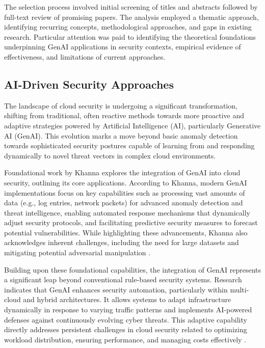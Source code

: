 The selection process involved initial screening of titles and abstracts followed by full-text review of promising papers. The analysis employed a thematic approach, identifying recurring concepts, methodological approaches, and gaps in existing research. Particular attention was paid to identifying the theoretical foundations underpinning GenAI applications in security contexts, empirical evidence of effectiveness, and limitations of current approaches.


\subsection{AI-Driven Security Approaches} %
\label{sec:AI-Driven Security Approaches}

The landscape of cloud security is undergoing a significant transformation, shifting from traditional, often reactive methods towards more proactive and adaptive strategies powered by Artificial Intelligence (AI), particularly Generative AI (GenAI). This evolution marks a move beyond basic anomaly detection towards sophisticated security postures capable of learning from and responding dynamically to novel threat vectors in complex cloud environments.

Foundational work by Khanna \cite{khanna_enhancing_2024} explores the integration of GenAI into cloud security, outlining its core applications. According to Khanna, modern GenAI implementations focus on key capabilities such as processing vast amounts of data (e.g., log entries, network packets) for advanced anomaly detection and threat intelligence, enabling automated response mechanisms that dynamically adjust security protocols, and facilitating predictive security measures to forecast potential vulnerabilities. While highlighting these advancements, Khanna also acknowledges inherent challenges, including the need for large datasets and mitigating potential adversarial manipulation \cite{khanna_enhancing_2024}.

Building upon these foundational capabilities, the integration of GenAI represents a significant leap beyond conventional rule-based security systems. Research indicates that GenAI enhances security automation, particularly within multi-cloud and hybrid architectures. It allows systems to adapt infrastructure dynamically in response to varying traffic patterns and implements AI-powered defenses against continuously evolving cyber threats. This adaptive capability directly addresses persistent challenges in cloud security related to optimizing workload distribution, ensuring performance, and managing costs effectively \cite{seth_ai_2025}.

